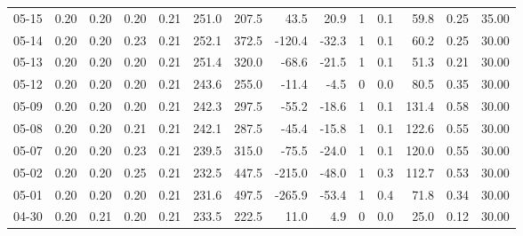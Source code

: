 \begin{threeparttable}
{\begin{tabular}{lrrrrrrrrrrrrr}
  05-15 &          0.20 &          0.20 &          0.20 &        0.21 &               251.0 &               207.5 &       43.5 &         20.9 &              1 &                 0.1 &             59.8 &            0.25 &                  35.00 \\
  05-14 &          0.20 &          0.20 &          0.23 &        0.21 &               252.1 &               372.5 &     -120.4 &        -32.3 &              1 &                 0.1 &             60.2 &            0.25 &                  30.00 \\
  05-13 &          0.20 &          0.20 &          0.20 &        0.21 &               251.4 &               320.0 &      -68.6 &        -21.5 &              1 &                 0.1 &             51.3 &            0.21 &                  30.00 \\
  05-12 &          0.20 &          0.20 &          0.20 &        0.21 &               243.6 &               255.0 &      -11.4 &         -4.5 &              0 &                 0.0 &             80.5 &            0.35 &                  30.00 \\
  05-09 &          0.20 &          0.20 &          0.20 &        0.21 &               242.3 &               297.5 &      -55.2 &        -18.6 &              1 &                 0.1 &            131.4 &            0.58 &                  30.00 \\
  05-08 &          0.20 &          0.20 &          0.21 &        0.21 &               242.1 &               287.5 &      -45.4 &        -15.8 &              1 &                 0.1 &            122.6 &            0.55 &                  30.00 \\
  05-07 &          0.20 &          0.20 &          0.23 &        0.21 &               239.5 &               315.0 &      -75.5 &        -24.0 &              1 &                 0.1 &            120.0 &            0.55 &                  30.00 \\
  05-02 &          0.20 &          0.20 &          0.25 &        0.21 &               232.5 &               447.5 &     -215.0 &        -48.0 &              1 &                 0.3 &            112.7 &            0.53 &                  30.00 \\
  05-01 &          0.20 &          0.20 &          0.20 &        0.21 &               231.6 &               497.5 &     -265.9 &        -53.4 &              1 &                 0.4 &             71.8 &            0.34 &                  30.00 \\
  04-30 &          0.20 &          0.21 &          0.20 &        0.21 &               233.5 &               222.5 &       11.0 &          4.9 &              0 &                 0.0 &             25.0 &            0.12 &                  30.00 \\

\end{tabular}}
\end{threeparttable}
